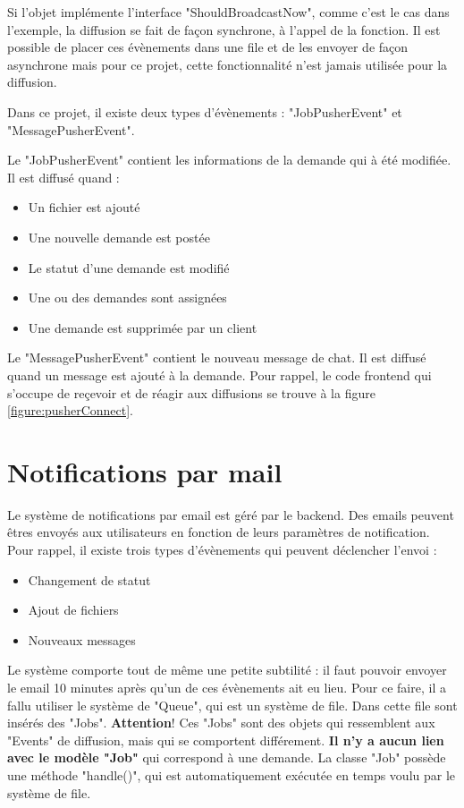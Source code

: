 \documentclass[
    iai, %
    eai, %
]{heig-tb}
\begin{document}
Si l'objet implémente l'interface "ShouldBroadcastNow", comme c'est le cas dans l'exemple, la diffusion se fait de façon synchrone, à l'appel de la fonction. Il est possible de placer ces évènements dans une file et de les envoyer de façon asynchrone mais pour ce projet, cette fonctionnalité n'est jamais utilisée pour la diffusion.

Dans ce projet, il existe deux types d'évènements : "JobPusherEvent" et "MessagePusherEvent".

Le "JobPusherEvent" contient les informations de la demande qui à été modifiée. Il est diffusé quand :
\begin{itemize}
  \item Un fichier est ajouté
  \item Une nouvelle demande est postée
  \item Le statut d'une demande est modifié
  \item Une ou des demandes sont assignées
  \item Une demande est supprimée par un client
\end{itemize}
\bigskip

Le "MessagePusherEvent" contient le nouveau message de chat. Il est diffusé quand un message est ajouté à la demande. Pour rappel, le code frontend qui s'occupe de reçevoir et de réagir aux diffusions se trouve à la figure \ref{figure:pusherConnect}.

\newpage
\section{Notifications par mail}
Le système de notifications par email est géré par le backend. Des emails peuvent êtres envoyés aux utilisateurs en fonction de leurs paramètres de notification.
Pour rappel, il existe trois types d'évènements qui peuvent déclencher l'envoi :
\begin{itemize}
  \item Changement de statut
  \item Ajout de fichiers
  \item Nouveaux messages
\end{itemize}
\bigskip

Le système comporte tout de même une petite subtilité : il faut pouvoir envoyer le email 10 minutes après qu'un de ces évènements ait eu lieu. Pour ce faire, il a fallu utiliser le système de "Queue", qui est un système de file. Dans cette file sont insérés des "Jobs". \textbf{Attention}! Ces "Jobs" sont des objets qui ressemblent aux "Events" de diffusion, mais qui se comportent différement. \textbf{Il n'y a aucun lien avec le modèle "Job"} qui correspond à une demande. La classe "Job" possède une méthode "handle()", qui est automatiquement exécutée en temps voulu par le système de file.
\end{document}

